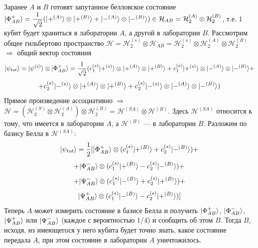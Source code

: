 Заранее $A$ и $B$ готовят запутанное белловское состояние $| \Phi_{AB}^+ \rangle = \dfrac{1}{\sqrt{2}}(| +^{(A)} \rangle\otimes| +^{(B)} \rangle + | -^{(A)} \rangle\otimes| -^{(B)} \rangle) \in \mathcal{H}_{AB}=\mathcal{H}_2^{(A)}\otimes\mathcal{H}_2^{(B)}$, т.е. 1 кубит будет храниться в лаборатории $A$, а другой в лаборатории $B$. Рассмотрим общее гильбертово пространство $\mathcal{H} = \mathcal{H}_2^{(s)}\otimes\mathcal{H}_{AB} = \mathcal{H}_2^{(s)}\otimes\mathcal{H}_2^{(A)}\otimes\mathcal{H}_2^{(B)}$ $\Longrightarrow$ общий вектор состояния
\[
| \psi_{tot} \rangle = | \psi^{(s)} \rangle\otimes| \Phi_{AB}^+ \rangle = \dfrac{1}{\sqrt{2}}(c_1^{(s)}| +^{(s)} \rangle\otimes| +^{(A)} \rangle\otimes| +^{(B)} \rangle + c_1^{(s)}| +^{(s)} \rangle\otimes| -^{(A)} \rangle\otimes| -^{(B)} \rangle + 
\]
\[
+ c_2^{(s)}| -^{(s)} \rangle\otimes| +^{(A)} \rangle\otimes| +^{(B)} \rangle + c_2^{(s)}| -^{(s)} \rangle\otimes| -^{(A)} \rangle\otimes| -^{(B)} \rangle)
\]
Прямое произведение ассоциативно $\Longrightarrow$ $\mathcal{H} = (\mathcal{H}_2^{(S)}\otimes\mathcal{H}_2^{(A)})\otimes\mathcal{H}_2^{(B)} = \mathcal{H}^{(SA)}\otimes\mathcal{H}^{(B)}$. Здесь $\mathcal{H}^{(SA)}$ относится к тому, что имеется в лаборатории $A$, а $\mathcal{H}^{(B)}$ --- в лаборатории $B$. Разложим по базису Белла в $\mathcal{H}^{(SA)}$:
\[
| \psi_{tot} \rangle = \dfrac{1}{2}[ | \Phi_{AB}^+ \rangle\otimes(c_1^{(s)}| +^{(B)} \rangle + c_2^{(s)}| -^{(B)} \rangle) +
\]
\[
+ | \Phi_{AB}^- \rangle\otimes(c_1^{(s)}| +^{(B)} \rangle - c_2^{(s)}| -^{(B)} \rangle) +
\]
\[
+ | \Psi_{AB}^- \rangle\otimes(c_1^{(s)}| -^{(B)} \rangle + c_2^{(s)}| +^{(B)} \rangle) +
\]
\[
| \Psi_{AB}^+ \rangle\otimes(c_1^{(s)}| -^{(B)} \rangle - c_2^{(s)}| +^{(B)} \rangle)]
\]
Теперь $A$ может измерить состояние в базисе Белла и получить $| \Phi_{AB}^+ \rangle$, $| \Phi_{AB}^- \rangle$, $| \Psi_{AB}^+ \rangle$ или $| \Psi_{AB}^- \rangle$ (каждое с вероятностью 1/4) и сообщить об этом $B$. Тогда $B$, исходя, из имеющегося у него кубита будет точно знать, какое состояние передала $A$, при этом состояние в лаборатории $A$ уничтожилось.